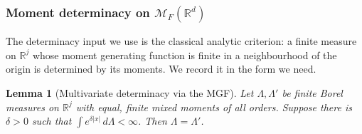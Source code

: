 \documentclass[11pt]{article}
\newtheorem{lemma}[theorem]{Lemma}
\theoremstyle{definition}
\theoremstyle{remark}
\newcommand{\R}{\mathbb{R}}
\newcommand{\cM}{{\mathcal{M}_F(\R^d)}}          %
\numberwithin{equation}{section}
\theoremstyle{plain}
\theoremstyle{definition}
\theoremstyle{remark}
\theoremstyle{plain}
\begin{document}
\subsubsection{Moment determinacy on $\cM$}

The determinacy input we use is the classical analytic criterion: a
finite measure on $\R^j$ whose moment generating function is finite in a
neighbourhood of the origin is determined by its moments. We record it in the
form we need.

\begin{lemma}[Multivariate determinacy via the MGF]
\label{lem:petersen}
Let $\Lambda,\Lambda'$ be finite Borel measures on $\R^j$ with equal,
finite mixed moments of all orders. Suppose there is $\delta>0$ such that
$\int e^{\delta|x|}\,d\Lambda<\infty$. Then $\Lambda=\Lambda'$.
\end{lemma}
\end{document}
